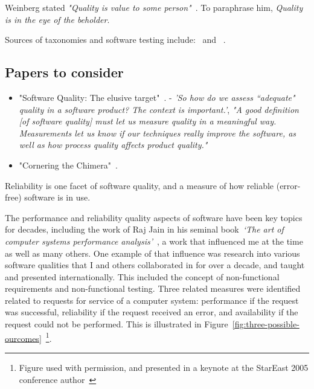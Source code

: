 Weinberg stated \emph{"Quality is value to some person"}~\cite{weinberg1992quality}. To paraphrase him, \emph{Quality is in the eye of the beholder}.


Sources of taxonomies and software testing include:~\cite{foidl2018_integrating_software_quality_models_into_risk_based_testing} and ~\cite{kitchenham1996_software_quality_elusive_target}.

\subsection{Papers to consider}

\begin{itemize}
    \item "Software Quality: The elusive target"~\cite{kitchenham1996_software_quality_elusive_target}. - \emph{'So how do we assess ``adequate" quality in a software product? The context is important.'}, \emph{"A good definition [of software quality] must let us measure quality in a meaningful way. Measurements let us know if our techniques really improve the software, as well as how process quality affects product quality."}
    \item "Cornering the Chimera"~\cite{dromey1996_cornering_the_chimera}.

\end{itemize}


Reliability is one facet of software quality, and a measure of how reliable (error-free) software is in use.  

The performance and reliability quality aspects of software have been key topics for decades, including the work of Raj Jain in his seminal book~\emph{`The art of computer systems performance analysis'}~\cite{jain1991art}, a work that influenced me at the time as well as many others. One example of that influence was research into various software qualities that I and others collaborated in for over a decade, and taught and presented internationally. This included the concept of non-functional requirements and non-functional testing. Three related measures were identified related to requests for service of a computer system: performance if the request was successful, reliability if the request received an error, and availability if the request could not be performed. This is illustrated in Figure~\ref{fig:three-possible-ourcomes}~\footnote{Figure used with permission, and presented in a keynote at the StarEast 2005 conference author~\cite{harty_stareast2005_keynote}}. 

